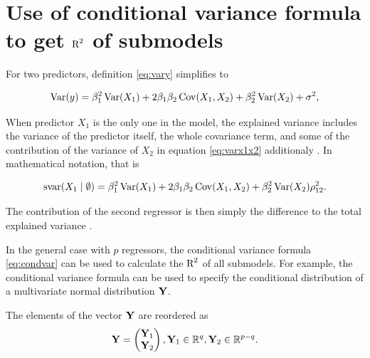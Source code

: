 \documentclass[11pt,a4paper,twoside]{book}\usepackage[]{graphicx}\usepackage[]{color}
\begin{document}
\section{Use of conditional variance formula to get $\text{R}^2$ of submodels}


For two predictors, definition \eqref{eq:vary} simplifies to

      \begin{align} 
        \operatorname{Var}(y) = \beta_{1}^2 \operatorname{Var}(X_{1}) + 2  \beta_{1}  \beta_{2} \operatorname{Cov}(X_{1}, X_{2}) + \beta_{2}^2 \operatorname{Var}(X_{2}) + \sigma^2, \label{eq:varx1x2} 
   \end{align}
 
 When predictor $X_{1}$ is the only one in the model, the explained variance includes the variance of the predictor itself, the whole covariance term, and some of the contribution of the variance of $X_{2}$ in equation \eqref{eq:varx1x2} additionaly . In mathematical notation, that is
 
      \begin{align} 
        \text{svar}({X_{1}} \mid \emptyset ) = \beta_{1}^2 \operatorname{Var}(X_{1}) + 2  \beta_{1}  \beta_{2} \operatorname{Cov}(X_{1}, X_{2}) + \beta_{2}^2 \operatorname{Var}(X_{2}) \rho_{12}^2 \text{.} \nonumber 
   \end{align}
   
The contribution of the second regressor is then simply the difference to the total explained variance \citep{Gromping2007}. 

In the general case with $p$ regressors, the conditional variance formula \eqref{eq:condvar} can be used to calculate the $\text{R}^2$ of all submodels. For example, the conditional variance formula can be used to specify the conditional distribution of a multivariate normal distribution ${\mathbf{Y}}$.

The elements of the vector ${\mathbf{Y}}$ are reordered as
\begin{align*}
\mathbf{Y} = \begin{pmatrix}
\mathbf{Y}_{1} \\ 
\mathbf{Y}_{2} \end{pmatrix}, \mathbf{Y}_{1} \in {\mathbb{R}}^q, \mathbf{Y}_{2} \in {\mathbb{R}}^{p-q} .
\end{align*}
\end{document}
